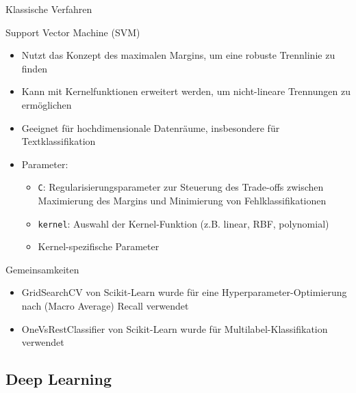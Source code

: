 \documentclass[aspectratio=169]{beamer} %
\begin{document}
\begin{frame}{Klassische Verfahren}
    \begin{block}{Support Vector Machine (SVM)}
        \begin{itemize}
            \item Nutzt das Konzept des maximalen Margins, um eine robuste Trennlinie zu finden
            \item Kann mit Kernelfunktionen erweitert werden, um nicht-lineare Trennungen zu ermöglichen
            \item Geeignet für hochdimensionale Datenräume, insbesondere für Textklassifikation
            \item Parameter:
                  \begin{itemize}
                      \item \texttt{C}: Regularisierungsparameter zur Steuerung des Trade-offs zwischen Maximierung des Margins und Minimierung von Fehlklassifikationen
                      \item \texttt{kernel}: Auswahl der Kernel-Funktion (z.B. linear, RBF, polynomial)
                      \item Kernel-spezifische Parameter
                  \end{itemize}
        \end{itemize}
    \end{block}
\end{frame}


\begin{frame}
    \begin{block}{Gemeinsamkeiten} %
        \begin{itemize}
            \item GridSearchCV von Scikit-Learn wurde für eine Hyperparameter-Optimierung nach (Macro Average) Recall verwendet
            \item OneVsRestClassifier von Scikit-Learn wurde für Multilabel-Klassifikation verwendet
        \end{itemize}
    \end{block}
\end{frame}

\subsection{Deep Learning}
\end{document}
